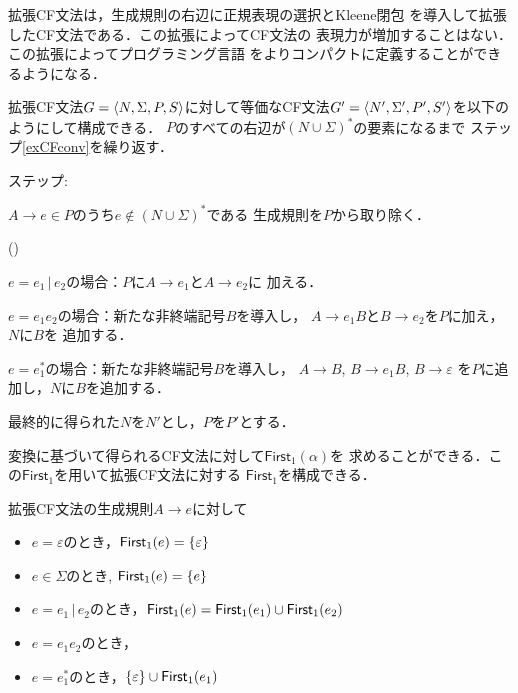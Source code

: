 \documentclass[a4j,dvipdfmx]{jbook}
\begin{document}
拡張CF文法は，生成規則の右辺に正規表現の選択とKleene閉包
を導入して拡張したCF文法である．この拡張によってCF文法の
表現力が増加することはない．この拡張によってプログラミング言語
をよりコンパクトに定義することができるようになる．

\begin{Alg}
  拡張CF文法$G=\langle{N,\Sigma,P,S}\rangle$に対して等価なCF文法$G'=
    \langle{N',\Sigma',P',S'}\rangle$を以下のようにして構成できる．
  $P$のすべての右辺が$(N\cup\Sigma)^\ast$の要素になるまで
  ステップ\ref{exCFconv}を繰り返す．
  \begin{list}{ステップ:}{}
    \item\label{exCFconv} $A\rightarrow e\in P$のうち$e\notin(N\cup\Sigma)^\ast$である
          生成規則を$P$から取り除く．
          \begin{list}{()}{}
            \item $e=e_1\,|\,e_2$の場合：$P$に$A\rightarrow e_1$と$A\rightarrow e_2$に
                  加える．
            \item $e=e_1e_2$の場合：新たな非終端記号$B$を導入し，
                  $A\rightarrow e_1B$と$B\rightarrow e_2$を$P$に加え，$N$に$B$を
                  追加する．
            \item $e=e_1^\ast$の場合：新たな非終端記号$B$を導入し，
                  $A\rightarrow B$, $B\rightarrow e_1B$, $B\rightarrow\varepsilon$
                  を$P$に追加し，$N$に$B$を追加する．
          \end{list}
  \end{list}
  最終的に得られた$N$を$N'$とし，$P$を$P'$とする．
\end{Alg}

変換に基づいて得られるCF文法に対して$\mathsf{First}_1(\alpha)$を
求めることができる．この$\mathsf{First}_1$を用いて拡張CF文法に対する
$\mathsf{First}_1$を構成できる．

\begin{Def}
  拡張CF文法の生成規則$A\rightarrow e$に対して
  \begin{itemize}
    \item $e=\varepsilon$のとき，$\mathsf{First}_1({e})=\{\varepsilon\}$
    \item $e\in\Sigma$のとき, $\mathsf{First}_1({e})=\{e\}$
    \item $e=e_1\,|\,e_2$のとき，$\mathsf{First}_1({e})=\mathsf{First}_1({e_1})\cup\mathsf{First}_1({e_2})$
    \item $e=e_1 e_2$のとき，
    \item $e=e_1^\ast$のとき，$\{\varepsilon\}\cup\mathsf{First}_1({e_1})$
  \end{itemize}
\end{Def}
\end{document}
